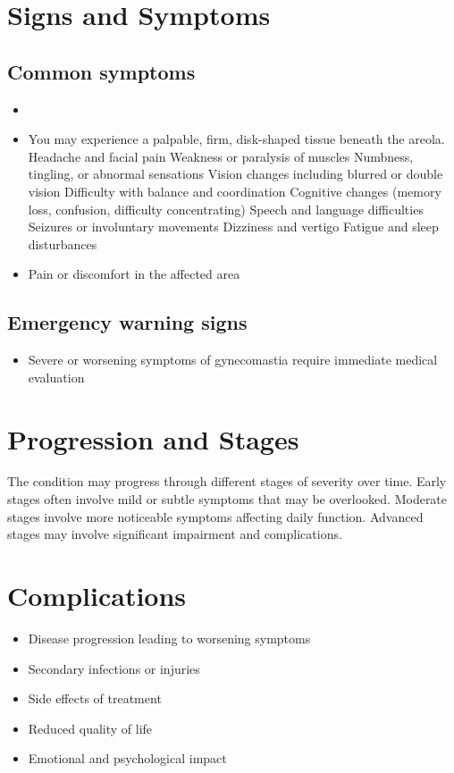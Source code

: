 \section{Signs and Symptoms}
\subsection{Common symptoms}
\begin{itemize}[noitemsep]
  \item \item You may experience a palpable, firm, disk-shaped tissue beneath the areola. Headache and facial pain Weakness or paralysis of muscles Numbness, tingling, or abnormal sensations Vision changes including blurred or double vision Difficulty with balance and coordination Cognitive changes (memory loss, confusion, difficulty concentrating) Speech and language difficulties Seizures or involuntary movements Dizziness and vertigo Fatigue and sleep disturbances
  \item Pain or discomfort in the affected area
  \end{itemize}
\subsection{Emergency warning signs}
\begin{itemize}[noitemsep]
  \item Severe or worsening symptoms of gynecomastia require immediate medical evaluation
\end{itemize}
\section{Progression and Stages}
The condition may progress through different stages of severity over time. Early stages often involve mild or subtle symptoms that may be overlooked. Moderate stages involve more noticeable symptoms affecting daily function. Advanced stages may involve significant impairment and complications.
\section{Complications}
\begin{itemize}[noitemsep]
  \item Disease progression leading to worsening symptoms
  \item Secondary infections or injuries
  \item Side effects of treatment
  \item Reduced quality of life
  \item Emotional and psychological impact
\end{itemize}
